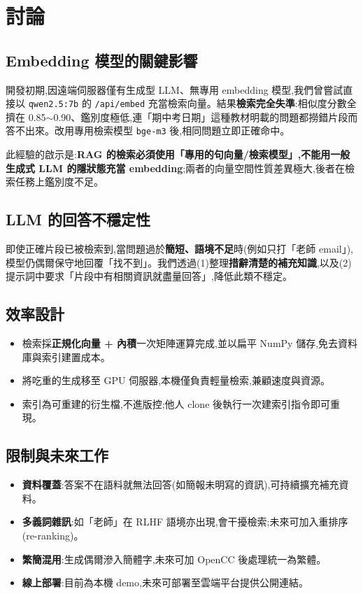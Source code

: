 \documentclass[12pt]{ctexart}
\begin{document}
\section{討論}

\subsection{Embedding 模型的關鍵影響}
開發初期,因遠端伺服器僅有生成型 LLM、無專用 embedding 模型,我們曾嘗試直接以 \texttt{qwen2.5:7b} 的 \texttt{/api/embed} 充當檢索向量。結果\textbf{檢索完全失準}:相似度分數全擠在 0.85$\sim$0.90、鑑別度極低,連「期中考日期」這種教材明載的問題都撈錯片段而答不出來。改用專用檢索模型 \texttt{bge-m3} 後,相同問題立即正確命中。

此經驗的啟示是:\textbf{RAG 的檢索必須使用「專用的句向量/檢索模型」,不能用一般生成式 LLM 的隱狀態充當 embedding};兩者的向量空間性質差異極大,後者在檢索任務上鑑別度不足。

\subsection{LLM 的回答不穩定性}
即使正確片段已被檢索到,當問題過於\textbf{簡短、語境不足}時(例如只打「老師 email」),模型仍偶爾保守地回覆「找不到」。我們透過(1)整理\textbf{措辭清楚的補充知識},以及(2)提示詞中要求「片段中有相關資訊就盡量回答」,降低此類不穩定。

\subsection{效率設計}
\begin{itemize}[leftmargin=2em]
  \item 檢索採\textbf{正規化向量 + 內積}一次矩陣運算完成,並以扁平 NumPy 儲存,免去資料庫與索引建置成本。
  \item 將吃重的生成移至 GPU 伺服器,本機僅負責輕量檢索,兼顧速度與資源。
  \item 索引為可重建的衍生檔,不進版控;他人 clone 後執行一次建索引指令即可重現。
\end{itemize}

\subsection{限制與未來工作}
\begin{itemize}[leftmargin=2em]
  \item \textbf{資料覆蓋}:答案不在語料就無法回答(如簡報未明寫的資訊),可持續擴充補充資料。
  \item \textbf{多義詞雜訊}:如「老師」在 RLHF 語境亦出現,會干擾檢索;未來可加入重排序(re-ranking)。
  \item \textbf{繁簡混用}:生成偶爾滲入簡體字,未來可加 OpenCC 後處理統一為繁體。
  \item \textbf{線上部署}:目前為本機 demo,未來可部署至雲端平台提供公開連結。
\end{itemize}
\end{document}
